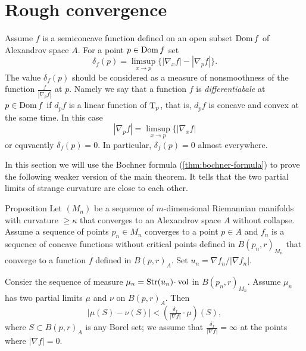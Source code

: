 \section{Rough convergence}
\label{sec:rough-convergence}

Assume $f$ is a semiconcave function defined on an open subset $\mathop{\rm Dom} f$ of Alexandrov space $A$.
For a point $p\in \mathop{\rm Dom} f$ set 
\[\delta_f(p)=\limsup_{x\to p}\{|\nabla_x f|-|\nabla_p f|\}.\]
The value $\delta_f(p)$ should be considered as a measure of nonsmoothness of the function $\tfrac{f}{|\nabla_p f|}$ at $p$.
Namely we say that a function $f$ is \emph{differentiabale} at $p\in\mathop{\rm Dom} f$
if $d_pf$ is a linear function of $\text{\rm T}_p$, that is, $d_pf$ is concave and convex at the same time.
In this case %
\[|\nabla_p f|=\limsup_{x\to p}\{|\nabla_x f|\]
or equvaently $\delta_f(p)=0$.
In particular, $\delta_f(p)=0$ almost everywhere. %


In this section we will use the Bochner formula (\ref{thm:bochner-formula}) to prove the following weaker version of the main theorem.
It tells that the two partial limits of strange curvature are close to each other. 

\begin{thm}{Proposition}
Let $(M_n)$ be a sequence of $m$-dimensional Riemannian manifolds with curvature $\ge\kappa$
that converges to an Alexandrov space $A$ without collapse.
Assume a sequence of points $p_n\in M_n$ converges to a point $p\in A$ 
and $f_n$ is a sequence of concave functions without critical points defined in $B(p_n,r)_{M_n}$ that converge to a function $f$ defined in  $B(p,r)_{A}$.
Set $u_n=\nabla f_n/|\nabla f_n|$.  

Consier the sequence of measure $\mu_n=\Str(u_n)\cdot \vol$ in $B(p_n,r)_{M_n}$.
Assume $\mu_n$ has two partial limits $\mu$ and $\nu$ on $B(p,r)_{A}$.
Then 
\[|\mu(S)-\nu(S)|
<
(\tfrac{\delta_f}{|\nabla f|}\cdot\mu)(S),\]
where $S\subset B(p,r)_{A}$ is any Borel set; we assume that $\frac{\delta_f}{|\nabla f|}=\infty$ at the points where $|\nabla f|=0$.
\end{thm}


